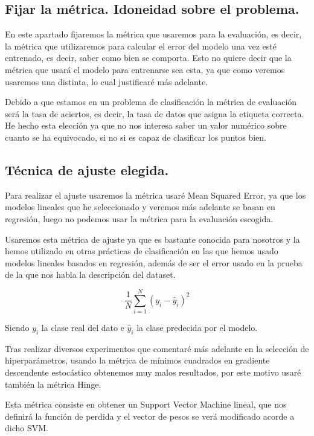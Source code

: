 \documentclass[12pt, spanish]{article}
\begin{document}
\subsection{Fijar la métrica. Idoneidad sobre el problema.}

En este apartado fijaremos la métrica que usaremos para la evaluación, es decir, la métrica que utilizaremos para calcular el error del modelo una vez esté entrenado, es decir, saber como bien se comporta. Esto no quiere decir que la métrica que usará el modelo para entrenarse sea esta, ya que como veremos usaremos una distinta, lo cual justificaré más adelante.

Debido a que estamos en un problema de clasificación la métrica de evaluación será la tasa de aciertos, es decir, la tasa de datos que asigna la etiqueta correcta. He hecho esta elección ya que no nos interesa saber un valor numérico sobre cuanto se ha equivocado, si no si es capaz de clasificar los puntos bien.



\subsection{Técnica de ajuste elegida.}

Para realizar el ajuste usaremos la métrica usaré Mean Squared Error, ya que los modelos lineales que he seleccionado y veremos más adelante se basan en regresión, luego no podemos usar la métrica para la evaluación escogida. 

Usaremos esta métrica de ajuste ya que es bastante conocida para nosotros y la hemos utilizado en otras prácticas de clasificación en las que hemos usado modelos lineales basados en regresión, además de ser el error usado en la prueba de la que nos habla la descripción del dataset.


$$ \frac{1}{N} \sum_{i=1}^{N}{(y_i - \hat{y}_i)^2} $$

Siendo $y_i$ la clase real del dato e $\hat{y}_i$ la clase predecida por el modelo.

Tras realizar diversos experimentos que comentaré más adelante en la selección de hiperparámetros, usando la métrica de mínimos cuadrados en gradiente descendente estocástico obtenemos muy malos resultados, por este motivo usaré también la métrica Hinge\cite{hingeLoss}.

Esta métrica consiste en obtener un Support Vector Machine lineal, que nos definirá la función de perdida y el vector de pesos se verá modificado acorde a dicho SVM.
\end{document}
